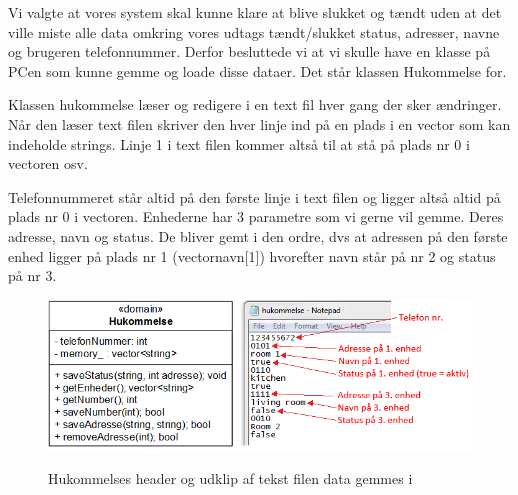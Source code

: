 Vi valgte at vores system skal kunne klare at blive slukket og tændt uden at det ville miste alle data omkring vores udtags tændt/slukket status, adresser, navne og brugeren telefonnummer. Derfor besluttede vi at vi skulle have en klasse på PCen som kunne gemme og loade disse dataer. Det står klassen Hukommelse for.
\medskip

Klassen hukommelse læser og redigere i en text fil hver gang der sker ændringer. Når den læser text filen skriver den hver linje ind på en plads i en vector som kan indeholde strings. Linje 1 i text filen kommer altså til at stå på plads nr 0 i vectoren osv.

\medskip
Telefonnummeret står altid på den første linje i text filen og ligger altså altid på plads nr 0 i vectoren. Enhederne har 3 parametre som vi gerne vil gemme. Deres adresse, navn og status. De bliver gemt i den ordre, dvs at adressen på den første enhed ligger på plads nr 1 (vectornavn[1]) hvorefter navn står på nr 2 og status på nr 3.\\

\begin{figure}[!htb]
     {\includegraphics[width=\textwidth]{billeder/uml/PC_dataview}}
     \caption{Hukommelses header og udklip af tekst filen data gemmes i}
     \label{fig:PC_Class}
\end{figure}
